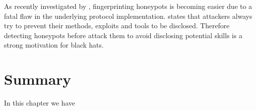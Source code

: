 As recently investigated by \citet{vetterl2020}, fingerprinting honeypots is becoming easier due to a fatal flaw in the underlying protocol implementation.
\citet{vetterl2020} states that attackers always try to prevent their methods, exploits and tools to be disclosed.
Therefore detecting honeypots before attack them to avoid disclosing potential skills is a strong motivation for black hats.


\section{Summary}

In this chapter we have
